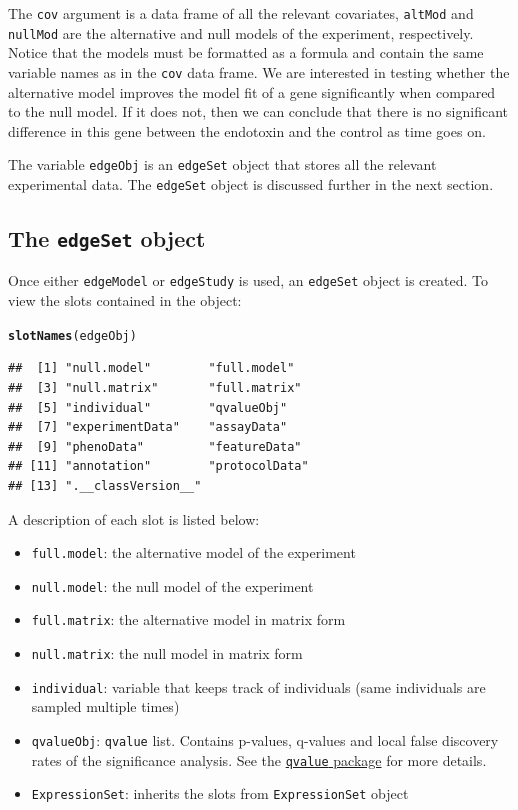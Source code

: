 \documentclass{article}\usepackage[]{graphicx}\usepackage[]{color}
\makeatletter
\newcommand{\hlstd}[1]{\textcolor[rgb]{0.345,0.345,0.345}{#1}}%
\newcommand{\hlkwd}[1]{\textcolor[rgb]{0.737,0.353,0.396}{\textbf{#1}}}%
\newenvironment{kframe}{%
 \def\at@end@of@kframe{}%
 \ifinner\ifhmode%
  \def\at@end@of@kframe{\end{minipage}}%
  \begin{minipage}{\columnwidth}%
 \fi\fi%
 \def\FrameCommand##1{\hskip\@totalleftmargin \hskip-\fboxsep
 \colorbox{shadecolor}{##1}\hskip-\fboxsep
     \hskip-\linewidth \hskip-\@totalleftmargin \hskip\columnwidth}%
 \MakeFramed {\advance\hsize-\width
   \@totalleftmargin\z@ \linewidth\hsize
   \@setminipage}}%
 {\par\unskip\endMakeFramed%
 \at@end@of@kframe}
\newenvironment{knitrout}{}{} %
\makeatother
\begin{document}
The {\tt cov} argument is a data frame of all the relevant covariates, {\tt altMod} and {\tt nullMod} are the alternative and null models of the experiment, respectively. Notice that the models must be formatted as a formula and contain the same variable names as in the {\tt cov} data frame. We are interested in testing whether the alternative model improves the model fit of a gene significantly when compared to the null model. If it does not, then we can conclude that there is no significant difference in this gene between the endotoxin and the control as time goes on. 

The variable {\tt edgeObj} is an {\tt edgeSet} object that stores all the relevant experimental data. The {\tt edgeSet} object is discussed further in the next section. 

\subsection{The {\tt edgeSet} object}
Once either {\tt edgeModel} or {\tt edgeStudy} is used, an {\tt edgeSet} object is created. To view the slots contained in the object:
\begin{knitrout}
\color{fgcolor}\begin{kframe}
\begin{alltt}
\hlkwd{slotNames}\hlstd{(edgeObj)}
\end{alltt}
\begin{verbatim}
##  [1] "null.model"        "full.model"       
##  [3] "null.matrix"       "full.matrix"      
##  [5] "individual"        "qvalueObj"        
##  [7] "experimentData"    "assayData"        
##  [9] "phenoData"         "featureData"      
## [11] "annotation"        "protocolData"     
## [13] ".__classVersion__"
\end{verbatim}
\end{kframe}
\end{knitrout}
A description of each slot is listed below: 
\begin{itemize}
\item {\tt full.model}: the alternative model of the experiment
\item {\tt null.model}: the null model of the experiment
\item {\tt full.matrix}: the alternative model in matrix form
\item {\tt null.matrix}: the null model in matrix form
\item {\tt individual}: variable that keeps track of individuals (same individuals are sampled multiple times)
\item {\tt qvalueObj}: {\tt qvalue} list. Contains p-values, q-values and local false discovery rates of the significance analysis. See the \href{http://www.bioconductor.org/packages/release/bioc/html/qvalue.html}{{\tt qvalue} package} for more details.
\item {\tt ExpressionSet}: inherits the slots from {\tt ExpressionSet} object
\end{itemize}
\end{document}
